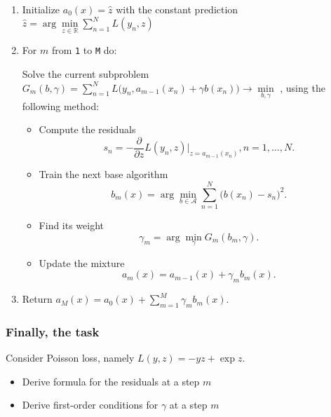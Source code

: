 \documentclass{article}
\begin{document}
\begin{enumerate}
    \item Initialize $a_0(x) = \hat{z}$ with the constant prediction
$   \hat{z} = \arg\min\limits_{z \in \mathbb{R}} \sum_{n=1}^N L(y_n, z)$

    \item For $m$ from \texttt{1} to \texttt{M} do:


Solve the current subproblem 
    $G_m(b, \gamma) = \sum_{n=1}^N L\bigl(y_n, a_{m-1}(x_n) + \gamma b(x_n)\bigr) \to \min\limits_{b, \gamma}$
, using the following method:
\begin{itemize}
    \item Compute the residuals
    \begin{equation}
        s_n = - \frac{\partial}{\partial z} L(y_n, z) \Big\vert_{z=a_{m-1}(x_n)}, n = 1,\dots, N.
    \end{equation}
    
    \item Train the next base algorithm
    \begin{equation}
        b_m(x) = \arg\min\limits_{b\in\mathcal{A}}\sum_{n=1}^N \bigl(b(x_n) - s_n\bigr)^2.
    \end{equation}
    
    \item Find its weight
    \begin{equation}
         \gamma_m = \arg\min_\gamma G_m(b_m, \gamma).
    \end{equation}
    
    \item Update the mixture 
    \begin{equation}
        a_m(x) = a_{m-1}(x) + \gamma_m b_m(x).
    \end{equation}
\end{itemize}

    \item Return  $a_M(x) = a_0(x) + \sum_{m=1}^M \gamma_m b_m(x)$.

\end{enumerate}

\subsubsection*{Finally, the task}
Consider Poisson loss, namely $L(y, z) = - yz + \exp{z}$.

\begin{itemize}
    \item Derive formula for the residuals at a step $m$
    \item Derive first-order conditions for $\gamma$ at a step $m$
\end{itemize}
\end{document}
